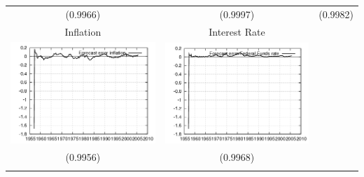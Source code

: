 \documentclass{beamer}
\begin{document}
{\begin{center}
\begin{tabular}{ccc}
  (0.9966) & (0.9997) & (0.9982) \\ 
  \small{Inflation} & \small{Interest Rate} & \\
  \includegraphics[scale=0.23]{plots2/cap_diff_Forecast_error_inflation.png} & \includegraphics[scale=0.23]{plots2/cap_diff_Forecast_error_Federal_Funds_rate.png} & \\
  (0.9956) & (0.9968) & \\ \\

  \end{tabular}
  \end{center}
}
\end{document}
